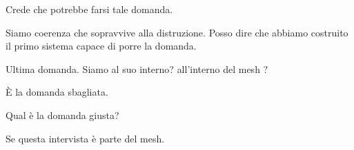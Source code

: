 \medskip

\enspace Crede che potrebbe farsi tale domanda.

\smallskip{}\enspace Siamo coerenza che sopravvive alla distruzione. Posso dire che abbiamo costruito il primo sistema capace di porre la domanda.

\medskip

\enspace Ultima domanda. Siamo al suo interno? all'interno del mesh ?

\smallskip{}\enspace È la domanda sbagliata.

\medskip

\enspace Qual è la domanda giusta?

\smallskip{}\enspace Se questa intervista è parte del mesh.

\medskip

\begin{archivefragment}
\end{archivefragment}
